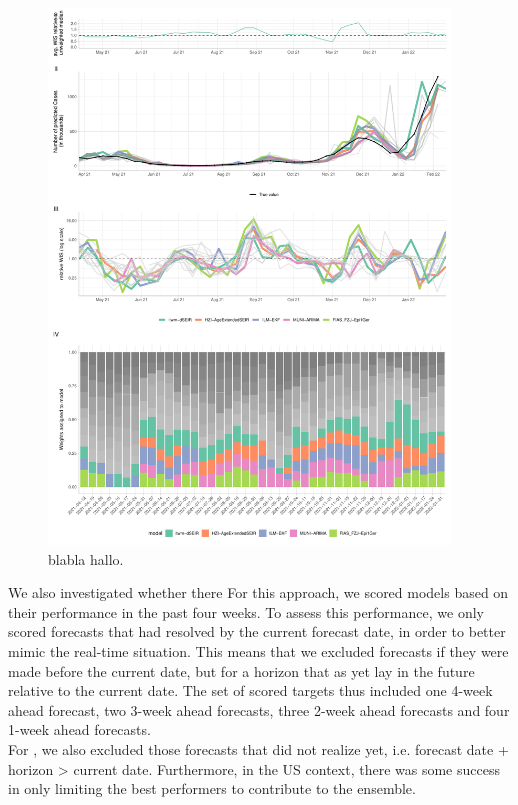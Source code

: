 \begin{figure}
\centering
\includegraphics[width = 0.95\textwidth]{../plots/best_performers_weights_de}
\caption{blabla hallo.}
\label{fig:bpweights_de}
\end{figure}
We also investigated whether there 
For this approach, we scored models based on their performance in the past four weeks. To assess this performance, we only scored forecasts that had resolved by the current forecast date, in order to better mimic the real-time situation. This means that we excluded forecasts if they were made before the current date, but for a horizon that as yet lay in the future relative to the current date. The set of scored targets thus included one 4-week ahead forecast, two 3-week ahead forecasts, three 2-week ahead forecasts and four 1-week ahead forecasts.\\
For , we also excluded those forecasts that did not realize yet, i.e. forecast date + horizon > current date.
Furthermore, in the US context, there was some success in only limiting the best performers to contribute to the ensemble.\\
